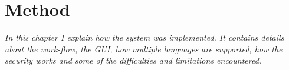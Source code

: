 \chapter{Method}

\textit{In this chapter I explain how the system was implemented. It contains details about the work-flow, the GUI, how multiple languages are supported, how the security works and some of the difficulties and limitations encountered.}








